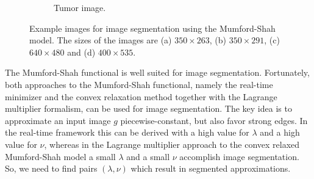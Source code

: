 \documentclass[abstracton]{scrreprt}
\begin{document}
\begin{figure}[!ht]
\begin{subfigure}[b]{0.25\textwidth}
                    \caption{Tumor image.}
                \end{subfigure}
                \caption[Example images for segmentation.]{Example images for image segmentation using the Mumford-Shah model. The sizes of the images are (a) $350 \times 263$, (b) $350 \times 291$, (c) $640 \times 480$ and (d) $400 \times 535$.}
            \label{fig:example_images_segmentation}
            \end{figure}
            The Mumford-Shah functional is well suited for image segmentation. Fortunately, both approaches to the Mumford-Shah functional, namely the real-time minimizer and the convex relaxation method together with the Lagrange multiplier formalism, can be used for image segmentation. The key idea is to approximate an input image $g$ piecewise-constant, but also favor strong edges. In the real-time framework this can be derived with a high value for $\lambda$ and a high value for $\nu$, whereas in the Lagrange multiplier approach to the convex relaxed Mumford-Shah model a small $\lambda$ and a small $\nu$ accomplish image segmentation. So, we need to find pairs $(\lambda, \nu)$ which result in segmented approximations.
\end{document}
